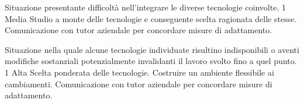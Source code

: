 {Situazione presentante difficoltà nell’integrare le diverse tecnologie coinvolte.}
{1}
{Media}
{Studio a monte delle tecnologie e conseguente scelta ragionata delle stesse.}
{Comunicazione con tutor aziendale per concordare misure di adattamento.}

{Situazione nella quale alcune tecnologie individuate risultino indisponibili o aventi modifiche sostanziali potenzialmente invalidanti il lavoro svolto fino a quel punto.}
{1}
{Alta}
{Scelta ponderata delle tecnologie. Costruire un ambiente flessibile ai cambiamenti.}
{Comunicazione con tutor aziendale per concordare misure di adattamento.}
